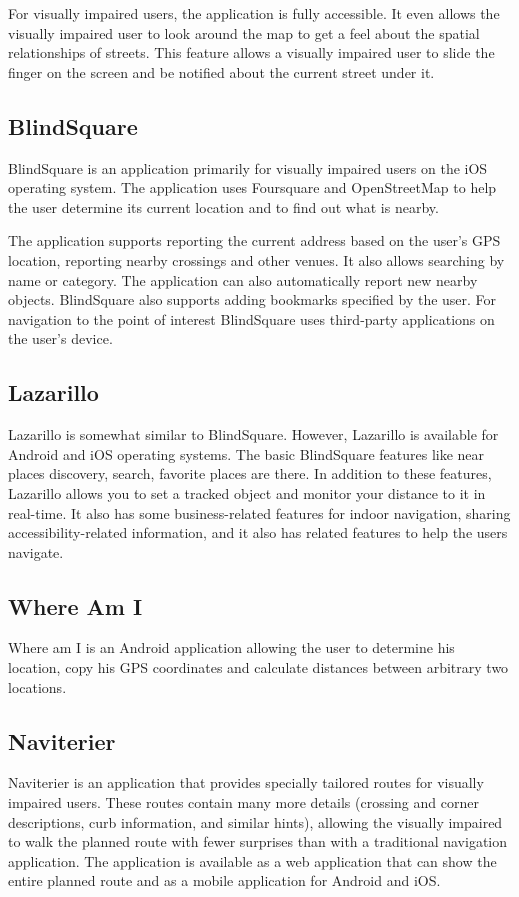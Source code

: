 \documentclass[nolof,digital]{fithesis3}
\begin{document}
For visually impaired users, the application is fully accessible. It even allows the visually impaired user to look around the map to get a feel about the spatial relationships of streets. This feature allows a visually impaired user to slide the finger on the screen and be notified about the current street under it.
\subsection{BlindSquare}
BlindSquare \parencite{blindsquare} is an application primarily for visually impaired users on the iOS operating system. The application uses Foursquare and OpenStreetMap to help the user determine its current location and to find out what is nearby.

The application supports reporting the current address based on the user's GPS location, reporting nearby crossings and other venues. It also allows searching by name or category. The application can also automatically report new nearby objects. BlindSquare also supports adding bookmarks specified by the user. For navigation to the point of interest BlindSquare uses third-party applications on the user's device.
\subsection{Lazarillo}
Lazarillo \parencite{lazarillo} is somewhat similar to BlindSquare. However, Lazarillo is available for Android and iOS operating systems. The basic BlindSquare features like near places discovery, search, favorite places are there. In addition to these features, Lazarillo allows you to set a tracked object and monitor your distance to it in real-time. It also has some business-related features for indoor navigation, sharing accessibility-related information, and it also has related features to help the users navigate.
\subsection{Where Am I}
Where am I \parencite{whereami} is an Android application allowing the user to determine his location, copy his GPS coordinates and calculate distances between arbitrary two locations.
\subsection{Naviterier}
Naviterier \parencite{naviterier} is an application that provides specially tailored routes for visually impaired users. These routes contain many more details (crossing and corner descriptions, curb information, and similar hints), allowing the visually impaired to walk the planned route with fewer surprises than with a traditional navigation application. The application is available as a web application that can show the entire planned route and as a mobile application for Android and iOS.
\end{document}
